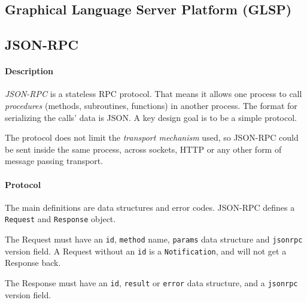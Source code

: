\subsection{Graphical Language Server Platform (GLSP)}\label{sec:glsp}


\subsection{JSON-RPC}

\paragraph*{Description}
\emph{JSON-RPC} is a stateless \acrfull{RPC} protocol.
That means it allows one process to call \emph{procedures} (methods, subroutines, functions) in another process.
The format for serializing the calls' data is \gls{JSON}.
A key design goal is to be a simple protocol.~\cite{json-rpcworkinggroupJSONRPCSpecification2010}

The protocol does not limit the \emph{transport mechanism} used, so \gls{JSON-RPC} could be sent inside the same process, across sockets, HTTP or any other form of message passing transport.~\cite{json-rpcworkinggroupJSONRPCSpecification2010}

\paragraph*{Protocol}
The main definitions are data structures and error codes.
\Gls{JSON-RPC} defines a \texttt{Request} and \texttt{Response} object.~\cite{json-rpcworkinggroupJSONRPCSpecification2010}

The Request must have an \texttt{id}, \texttt{method} name, \texttt{params} data structure and \texttt{jsonrpc} version field.
A Request without an \texttt{id} is a \texttt{Notification}, and will not get a Response back.~\cite{json-rpcworkinggroupJSONRPCSpecification2010}

The Response must have an \texttt{id}, \texttt{result} or \texttt{error} data structure, and a \texttt{jsonrpc} version field.~\cite{json-rpcworkinggroupJSONRPCSpecification2010}
